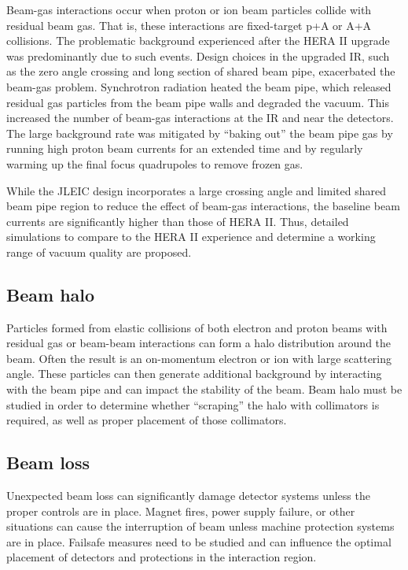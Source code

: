 Beam-gas interactions occur when proton or ion beam particles collide with residual beam gas.  That is, these interactions are fixed-target p+A or A+A collisions.  The problematic background experienced after the HERA II upgrade was predominantly due to such events.  Design choices in the upgraded IR, such as the zero angle crossing and long section of shared beam pipe, exacerbated the beam-gas problem.  Synchrotron radiation heated the beam pipe, which released residual gas particles from the beam pipe walls and degraded the vacuum.  This increased the number of beam-gas interactions at the IR and near the detectors.  The large background rate was mitigated by “baking out” the beam pipe gas by running high proton beam currents for an extended time and by regularly warming up the final focus quadrupoles to remove frozen gas.  

While the JLEIC design incorporates a large crossing angle and limited shared beam pipe region to reduce the effect of beam-gas interactions, the baseline beam currents are significantly higher than those of HERA II.  Thus, detailed simulations to compare to the HERA II experience and determine a working range of vacuum quality are proposed. 

\subsection{Beam halo}

Particles formed from elastic collisions of both electron and proton beams with residual gas or beam-beam interactions can form a halo distribution around the beam.  Often the result is an on-momentum electron or ion with large scattering angle. These particles can then generate additional background by interacting with the beam pipe and can impact the stability of the beam.  Beam halo must be studied in order to determine whether “scraping” the halo with collimators is required, as well as proper placement of those collimators.

\subsection{Beam loss}

Unexpected beam loss can significantly damage detector systems unless the proper controls are in place.  Magnet fires, power supply failure, or other situations can cause the interruption of beam unless machine protection systems are in place.  Failsafe measures need to be studied and can influence the optimal placement of detectors and protections in the interaction region.

